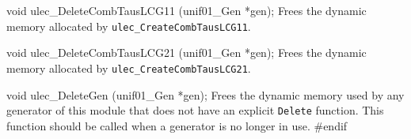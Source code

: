 

\code
void ulec_DeleteCombTausLCG11 (unif01_Gen *gen);
\endcode
  \tab Frees the dynamic memory allocated by
   {\tt ulec\_CreateCombTausLCG11}.
 \endtab
\code


void ulec_DeleteCombTausLCG21 (unif01_Gen *gen);
\endcode
  \tab Frees the dynamic memory allocated by
   {\tt ulec\_CreateCombTausLCG21}.
 \endtab
\code


void ulec_DeleteGen (unif01_Gen *gen);
\endcode
 \tab Frees the dynamic memory used by any generator of this module
  that does not have an explicit {\tt Delete} function. 
  This function should be called when a generator
  is no longer in use.
 \endtab
\code   
\hide
#endif
\endhide
\endcode


\iffalse  %
\bigskip
\hrule
\bigskip

{
See also
\bigskip

\setlength{\partopsep}{0pt}
\setlength{\parskip}{0pt}
\setlength{\topsep}{0pt}
\setlength{\itemsep}{0pt}

\begin{itemize}
\item {\tt utezu\_CreateTezLec91}
\end{itemize}
}
\fi  %
